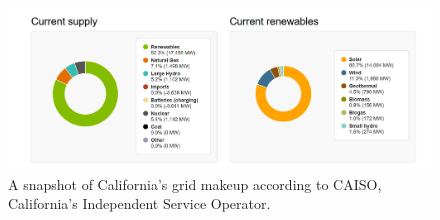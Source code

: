 \documentclass{article}
\begin{document}
\begin{figure}[h]
    \centering
    \includegraphics[width=\textwidth]{renewables.png}
    \caption{A snapshot of California's grid makeup according to CAISO, California's Independent Service Operator.}
    \label{fig:grid2}
 \end{figure}
\end{document}

